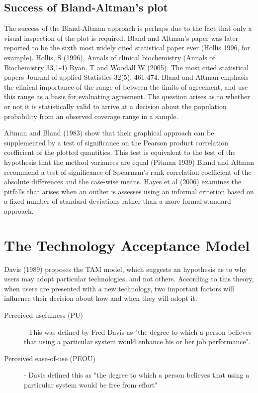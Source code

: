 \documentclass[MAIN.tex]{subfiles}
\begin{document}
\subsection{Success of Bland-Altman’s plot}
The success of the Bland-Altman approach is perhaps due to the fact that only a visual inspection of the plot is required. Bland and Altman’s paper was later reported to be the sixth most widely cited statistical paper ever (Hollis 1996, for example).
Hollis, S (1996), Annals of clinical biochemistry (Annals of Biochemistry 33,1-4)
Ryan, T and Woodall W (2005). The most cited statistical papers Journal of applied Statistics 32(5), 461-474.
Bland and Altman emphasis the clinical importance of the range of between the limits of agreement, and use this range as a basis for evaluating agreement.
The question arises as to whether  or not it is statistically valid to arrive at a decision about the population probability from an observed coverage range in a sample.

Altman and Bland (1983) show that their graphical approach can be supplemented by a test of significance on the Pearson product correlation coefficient of the plotted quantities. This test is equivalent to the test of the hypothesis that the method variances are equal (Pitman 1939)
Bland and Altman recommend a test of significance of Spearman’s rank correlation coefficient of the absolute differences and the case-wise means.
Hayes et al (2006) examines the pitfalls that arises when an outlier is assesses using an informal criterion based on a fixed number of standard deviations rather than a more formal standard approach.
\section{The Technology Acceptance Model}
Davis (1989) proposes the TAM model, which suggests an hypothesis as to why users may adopt particular technologies, and not others. 
According to this theory, when users are presented with a new 
technology, two important factors will influence their decision about how and when they will adopt it.
\begin{description}
	\item[Perceived usefulness (PU)] - This was defined by Fred Davis as "the degree to which a person believes that using a particular system would enhance his or her job performance".
	\item[Perceived ease-of-use (PEOU)] - Davis defined this as "the degree to which a person believes that using a particular system would be free from effort" 
\end{description}
\end{document}
